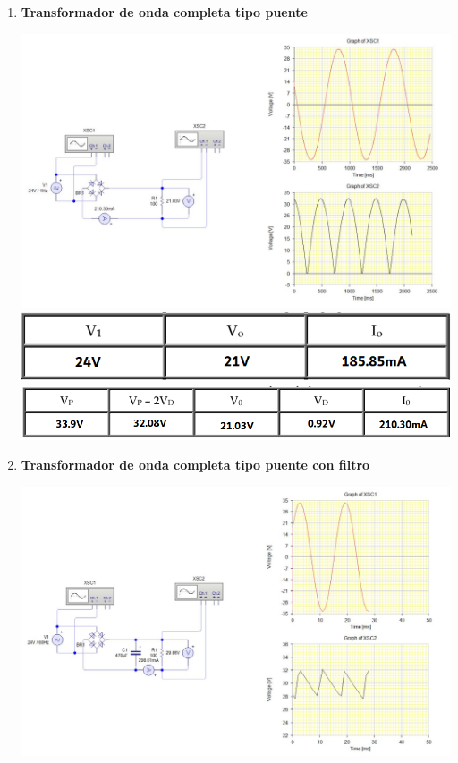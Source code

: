 \documentclass[12pt]{article}
\begin{document}
\begin{itemize}
\begin{enumerate}
\begin{center}
            \end{center}
            \item \textbf{Transformador de onda completa tipo puente}
            \begin{center}
                \includegraphics*[scale=0.4]{sim7.jpg}
                \includegraphics*[scale=0.4]{medSimFBR1.png}
                \includegraphics*[scale=0.4]{medSimFBR2.png}
            \end{center}
            \item \textbf{Transformador de onda completa tipo puente con filtro}
            \begin{center}
                \includegraphics*[scale=0.4]{sim8.jpg}

\end{center}
\end{enumerate}
\end{itemize}
\end{document}
